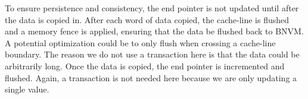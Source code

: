 To ensure persistence and consistency, the end pointer is not updated until
after the data is copied in. After each word of data copied, the cache-line
is flushed and a memory fence is applied, ensuring that the data be flushed back
to BNVM. A potential optimization could be to only flush when crossing a
cache-line boundary. The reason we do not use a transaction here is that the
data could be arbitrarily long. Once the data is copied, the end pointer is
incremented and flushed. Again, a transaction is not needed here because we are
only updating a single value.




